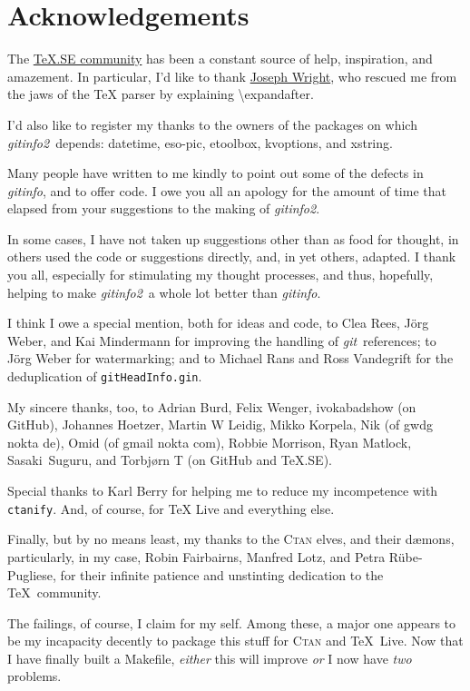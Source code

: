\documentclass[a4paper,12pt,twoside,openany]{memoir}
\newcommand{\sfit}[1]{\textit{#1}}
\newcommand{\git}{\sfit{git}}
\newcommand{\opname}{\sfit{gitinfo}}
\newcommand{\tpname}{\sfit{gitinfo2}}
\newcommand{\ginname}{gitHeadInfo.gin}
\newcommand{\metaname}{\texttt{\ginname}}
\begin{document}
\clearpage
\section{Acknowledgements}

The \href{http://tex.stackexchange.com}{\TeX.SE community}
has been a constant source of help, inspiration, and amazement.
In particular, I'd like to thank
\href{http://tex.stackexchange.com/users/73/joseph-wright}{Joseph Wright},
who rescued me from the jaws of the TeX parser by explaining
\textbackslash expandafter.

I'd also like to register my thanks to the owners of the packages on which
\tpname\ depends: datetime, eso-pic, etoolbox, kvoptions, and xstring.

Many people have written to me kindly
to point out some of the defects in \opname, and to offer code.
I owe you all an apology for the amount of time that elapsed
from your suggestions to the making of \tpname.

In some cases, I have not taken up suggestions other than as food for thought,
in others used the code or suggestions directly, and,
in yet others, adapted.
I thank you all, especially for stimulating my thought processes,
and thus, hopefully,
helping to make \tpname\ a whole lot better than \opname.

I think I owe a special mention, both for ideas and code,
to Clea Rees, Jörg Weber, and Kai Mindermann
for improving the handling of \git\ references;
to Jörg Weber for watermarking;
and to Michael Rans and Ross Vandegrift for
the deduplication of \metaname.

My sincere thanks, too, to
Adrian Burd,
Felix Wenger,
ivokabadshow (on GitHub),
Johannes Hoetzer,
Martin W Leidig,
Mikko Korpela,
Nik (of gwdg nokta de),
Omid (of gmail nokta com),
Robbie Morrison,
Ryan Matlock,
Sasaki~Suguru,
and
Torbjørn T (on GitHub and TeX.SE).

Special thanks to Karl Berry for helping me to
reduce my incompetence with \texttt{ctanify}.
And, of course, for \TeX{} Live and everything else.

Finally, but by no means least,
my thanks to the \textsc{Ctan} elves, and their dæmons,
particularly, in my case,
Robin Fairbairns, Manfred Lotz, and Petra Rübe-Pugliese,
for their infinite patience and unstinting
dedication to the \TeX\ community.

The failings, of course, I claim for my self.
Among these, a major one appears to be my incapacity
decently to package this stuff for
\textsc{Ctan} and \TeX{}~Live.
Now that I have finally built a Makefile,
\emph{either} this will improve \emph{or}
I now have \emph{two} problems.
\clearpage
\end{document}

